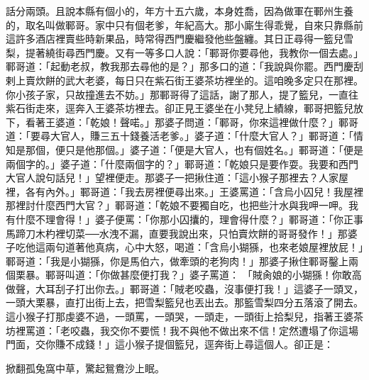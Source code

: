 \begin{showcontents}{}
話分兩頭。且說本縣有個小的，年方十五六歲，本身姓喬，因為做軍在鄆州生養的，取名叫做鄆哥。家中只有個老爹，年紀高大。那小廝生得乖覺，自來只靠縣前這許多酒店裡賣些時新果品，時常得西門慶繼發他些盤纏。其日正尋得一籃兒雪梨，提著繞街尋西門慶。又有一等多口人說：「鄆哥你要尋他，我教你一個去處。」鄆哥道：「起動老叔，教我那去尋他的是？」那多口的道：「我說與你罷。西門慶刮剌上賣炊餅的武大老婆，每日只在紫石街王婆茶坊裡坐的。這咱晚多定只在那裡。你小孩子家，只故撞進去不妨。」那鄆哥得了這話，謝了那人，提了籃兒，一直往紫石街走來，逕奔入王婆茶坊裡去。卻正見王婆坐在小凳兒上績線，鄆哥把籃兒放下，看著王婆道：「乾娘！聲喏。」那婆子問道：「鄆哥，你來這裡做什麼？」鄆哥道：「要尋大官人，賺三五十錢養活老爹。」婆子道：「什麼大官人？」鄆哥道：「情知是那個，便只是他那個。」婆子道：「便是大官人，也有個姓名。」鄆哥道：「便是兩個字的。」婆子道：「什麼兩個字的？」鄆哥道：「乾娘只是要作耍。我要和西門大官人說句話兒！」望裡便走。那婆子一把揪住道：「這小猴子那裡去？人家屋裡，各有內外。」鄆哥道：「我去房裡便尋出來。」王婆罵道：「含烏小囚兒！我屋裡那裡討什麼西門大官？」鄆哥道：「乾娘不要獨自吃，也把些汁水與我呷一呷。我有什麼不理會得！」婆子便罵：「你那小囚攮的，理會得什麼？」鄆哥道：「你正事馬蹄刀木杓裡切菜──水洩不漏，直要我說出來，只怕賣炊餅的哥哥發作！」那婆子吃他這兩句道著他真病，心中大怒，喝道：「含烏小猢猻，也來老娘屋裡放屁！」鄆哥道：「我是小猢猻，你是馬伯六，做牽頭的老狗肉！」那婆子揪住鄆哥鑿上兩個栗暴。鄆哥叫道：「你做甚麼便打我？」婆子罵道： 「賊肏娘的小猢猻！你敢高做聲，大耳刮子打出你去。」鄆哥道：「賊老咬蟲，沒事便打我！」這婆子一頭叉，一頭大栗暴，直打出街上去，把雪梨籃兒也丟出去。那籃雪梨四分五落滾了開去。這小猴子打那虔婆不過，一頭罵，一頭哭，一頭走，一頭街上拾梨兒，指著王婆茶坊裡罵道：「老咬蟲，我交你不要慌！我不與他不做出來不信！定然遭塌了你這場門面，交你賺不成錢！」這小猴子提個籃兒，逕奔街上尋這個人。卻正是：

掀翻孤兔窩中草，驚起鴛鴦沙上眠。



\end{showcontents}
